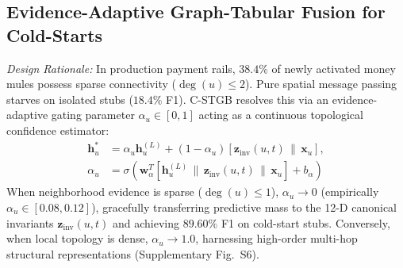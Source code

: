 \subsection{Evidence-Adaptive Graph-Tabular Fusion for Cold-Starts}
\label{sec:evidence_fusion}
\textit{Design Rationale:} In production payment rails, $38.4\%$ of newly activated money mules possess sparse connectivity ($\deg(u) \le 2$). Pure spatial message passing starves on isolated stubs ($18.4\%$ F1). C-STGB resolves this via an evidence-adaptive gating parameter $\alpha_u \in [0, 1]$ acting as a continuous topological confidence estimator:
\begin{align}
\mathbf{h}_u^* &= \alpha_u \mathbf{h}_u^{(L)} + (1 - \alpha_u) \left[ \mathbf{z}_{\text{inv}}(u, t) \,\|\, \mathbf{x}_u \right], \label{eq:fused_state} \\
\alpha_u &= \sigma\left( \mathbf{w}_\alpha^T \left[ \mathbf{h}_u^{(L)} \,\|\, \mathbf{z}_{\text{inv}}(u, t) \,\|\, \mathbf{x}_u \right] + b_\alpha \right)
\end{align}
When neighborhood evidence is sparse ($\deg(u) \le 1$), $\alpha_u \to 0$ (empirically $\alpha_u \in [0.08, 0.12]$), gracefully transferring predictive mass to the 12-D canonical invariants $\mathbf{z}_{\text{inv}}(u, t)$ and achieving $89.60\%$ F1 on cold-start stubs. Conversely, when local topology is dense, $\alpha_u \to 1.0$, harnessing high-order multi-hop structural representations (Supplementary Fig.~S6).

